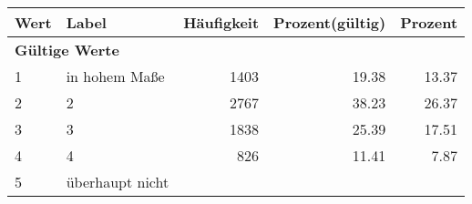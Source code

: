      \begin{longtable}{lXrrr}
     \toprule
     \textbf{Wert} & \textbf{Label} & \textbf{Häufigkeit} & \textbf{Prozent(gültig)} & \textbf{Prozent} \\
     \endhead
     \midrule
     \multicolumn{5}{l}{\textbf{Gültige Werte}}\\

     1 &
     \multicolumn{1}{X}{ in hohem Maße   } &


       \num{1403} &
       \num[round-mode=places,round-precision=2]{19,38} &
         \num[round-mode=places,round-precision=2]{13,37} \\

     2 &
     \multicolumn{1}{X}{ 2   } &


       \num{2767} &
       \num[round-mode=places,round-precision=2]{38,23} &
         \num[round-mode=places,round-precision=2]{26,37} \\

     3 &
     \multicolumn{1}{X}{ 3   } &


       \num{1838} &
       \num[round-mode=places,round-precision=2]{25,39} &
         \num[round-mode=places,round-precision=2]{17,51} \\

     4 &
     \multicolumn{1}{X}{ 4   } &


       \num{826} &
       \num[round-mode=places,round-precision=2]{11,41} &
         \num[round-mode=places,round-precision=2]{7,87} \\

     5 &
     \multicolumn{1}{X}{ überhaupt nicht   } &



\end{longtable}
